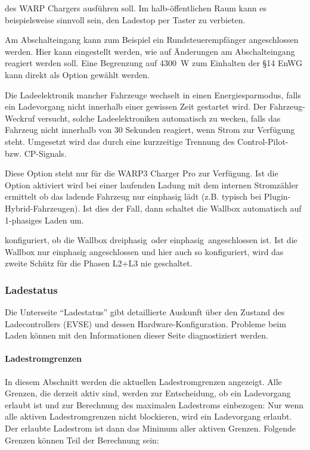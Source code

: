 \documentclass[a4paper,10pt]{article}
\begin{document}
\begin{multicols*}{2}
\begin{description}[labelindent=0.5cm, leftmargin=0.5cm]
     des WARP Chargers ausführen soll. Im halb-öffentlichen Raum kann es beispielsweise sinnvoll sein,
     den Ladestop per Taster zu verbieten.
     \item[Abschalteingang] Am Abschalteingang kann zum Beispiel ein Rundsteuerempfänger angeschlossen werden.
     Hier kann eingestellt werden, wie auf Änderungen am Abschalteingang
	 reagiert werden soll. Eine Begrenzung auf \SI{4300}{\watt} zum Einhalten
	 der \S14 EnWG kann direkt als Option gewählt werden.
     \item[Fahrzeug-Weckruf] Die Ladeelektronik mancher Fahrzeuge wechselt in
	 einen Energiesparmodus, falls ein Ladevorgang nicht innerhalb einer
	 gewissen Zeit gestartet wird. Der Fahrzeug-Weckruf versucht, solche Ladeelektroniken automatisch zu wecken, falls das Fahrzeug nicht innerhalb von 30 Sekunden reagiert, wenn Strom zur Verfügung steht. Umgesetzt wird das durch eine kurzzeitige Trennung des Control-Pilot- bzw. CP-Signals.
	 \item[Automatischer Phasenwechsel] Diese Option steht nur für die WARP3
	 Charger Pro zur Verfügung. Ist die Option aktiviert wird bei einer
	 laufenden Ladung mit dem internen Stromzähler ermittelt ob das ladende
	 Fahrzeug nur einphasig lädt (z.B. typisch bei Plugin-Hybrid-Fahrzeugen).
	 Ist dies der Fall, dann schaltet die Wallbox automatisch auf 1-phasiges
	 Laden um.
	 \item[Zuleitung] konfiguriert, ob die Wallbox
	 \glqq dreiphasig\grqq~oder \glqq einphasig\grqq~angeschlossen ist. Ist die
	 Wallbox nur einphasig angeschlossen und hier auch so konfiguriert, wird das zweite
	 Schütz für die Phasen L2+L3 nie geschaltet.
    \end{description}

    \vspace{-0.3cm}
    \subsubsection{Ladestatus}\label{evse}
    \vspace{-0.1cm}
    Die Unterseite \enquote{Ladestatus} gibt detaillierte Auskunft über den Zustand
    des Ladecontrollers (EVSE) und dessen Hardware-Konfiguration. Probleme beim Laden
    können mit den Informationen dieser Seite diagnostiziert werden.

    \vspace{-0.4cm}
    \paragraph{Ladestromgrenzen}
    In diesem Abschnitt werden die aktuellen Ladestromgrenzen angezeigt. Alle Grenzen, die
    derzeit aktiv sind, werden zur Entscheidung, ob ein Ladevorgang erlaubt ist und zur Berechnung des maximalen Ladestroms einbezogen:
    Nur wenn alle aktiven Ladestromgrenzen nicht blockieren, wird ein Ladevorgang erlaubt.
    Der erlaubte Ladestrom ist dann das Minimum aller aktiven Grenzen. Folgende Grenzen können Teil der Berechnung sein:


\end{multicols*}
\end{document}
